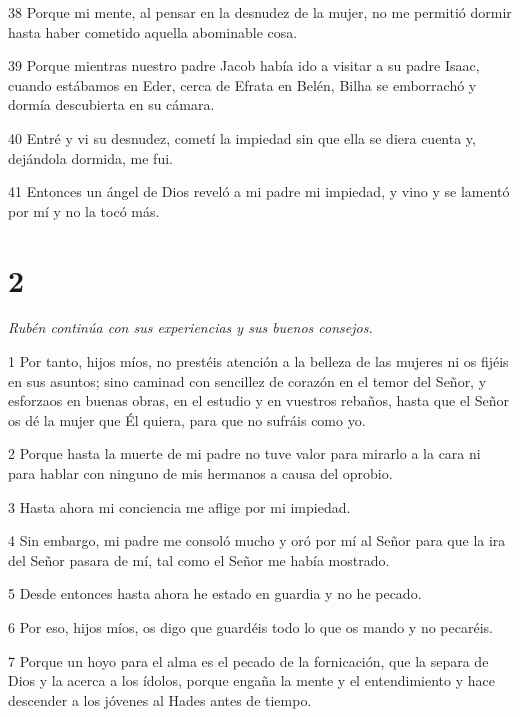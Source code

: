 \par 38 Porque mi mente, al pensar en la desnudez de la mujer, no me permitió dormir hasta haber cometido aquella abominable cosa.

\par 39 Porque mientras nuestro padre Jacob había ido a visitar a su padre Isaac, cuando estábamos en Eder, cerca de Efrata en Belén, Bilha se emborrachó y dormía descubierta en su cámara.

\par 40 Entré y vi su desnudez, cometí la impiedad sin que ella se diera cuenta y, dejándola dormida, me fui.

\par 41 Entonces un ángel de Dios reveló a mi padre mi impiedad, y vino y se lamentó por mí y no la tocó más.

\chapter{2}

\par \textit{Rubén continúa con sus experiencias y sus buenos consejos.}

\par 1 Por tanto, hijos míos, no prestéis atención a la belleza de las mujeres ni os fijéis en sus asuntos; sino caminad con sencillez de corazón en el temor del Señor, y esforzaos en buenas obras, en el estudio y en vuestros rebaños, hasta que el Señor os dé la mujer que Él quiera, para que no sufráis como yo.

\par 2 Porque hasta la muerte de mi padre no tuve valor para mirarlo a la cara ni para hablar con ninguno de mis hermanos a causa del oprobio.

\par 3 Hasta ahora mi conciencia me aflige por mi impiedad.

\par 4 Sin embargo, mi padre me consoló mucho y oró por mí al Señor para que la ira del Señor pasara de mí, tal como el Señor me había mostrado.

\par 5 Desde entonces hasta ahora he estado en guardia y no he pecado.

\par 6 Por eso, hijos míos, os digo que guardéis todo lo que os mando y no pecaréis.

\par 7 Porque un hoyo para el alma es el pecado de la fornicación, que la separa de Dios y la acerca a los ídolos, porque engaña la mente y el entendimiento y hace descender a los jóvenes al Hades antes de tiempo.

